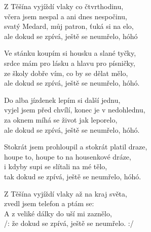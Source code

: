 
\ve{}
Z Těšína vyjíždí vlaky co čtvrthodinu,  \quad {} \quad {}\quad\\
včera jsem nespal a ani dnes nespočinu, \quad {} \quad {}\quad\\
svatý Medard, můj patron, ťuká si na elo, \quad\\
ale dokud se zpívá, ještě se neumřelo, hóhó \quad {} \quad {}\quad

\ve{}
Ve stánku koupím si housku a slané tyčky,\\
srdce mám pro lásku a hlavu pro písničky,\\
ze školy dobře vím, co by se dělat mělo,\\
ale dokud se zpívá, ještě se neumřelo, hóhó. 

\ve{}
Do alba jízdenek lepím si další jednu,\\
vyjel jsem před chvílí, konec je v nedohlednu,\\
za oknem míhá se život jak leporelo,\\
ale dokud se zpívá, ještě se neumřelo, hóhó. 

\ve{}
Stokrát jsem prohloupil a stokrát platil draze,\\
houpe to, houpe to na housenkové dráze,\\
i kdyby supi se slítali na mé tělo,\\
tak dokud se zpívá, ještě se neumřelo, hóhó. 

\ve{}
Z Těšína vyjíždí vlaky až na kraj světa,\\
zvedl jsem telefon a ptám se: \\
A z veliké dálky do uší mi zaznělo,\\
/: že dokud se zpívá, ještě se neumřelo. :/ 

\esong{}